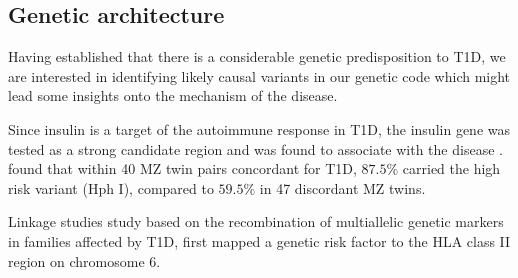 



\subsection{Genetic architecture}

Having established that there is a considerable genetic predisposition to T1D, we are interested in identifying likely causal variants in our genetic code which might lead
some insights onto the mechanism of the disease.

Since insulin is a target of the autoimmune response in T1D, the insulin gene  was tested as a strong candidate region and was found to associate with
the disease \citep{Metcalfe:2001}. 
\citet{Metcalfe:2001} found that within 40 \gls{MZ} twin pairs concordant for T1D, $87.5\%$ carried the high risk  variant (Hph I),
compared to $59.5\%$ in 47 discordant MZ twins.


Linkage studies study based on the recombination of multiallelic genetic markers in families affected by T1D,
first mapped a genetic risk factor to the HLA class II region on chromosome 6.


